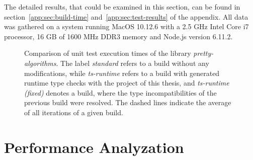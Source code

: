 The detailed results, that could be examined in this section, can be found in section~\ref{app:sec:build-time} and~\ref{app:sec:test-results} of the appendix. All data was gathered on a system running MacOS 10.12.6 with a 2.5 GHz Intel Core i7 processor, 16 GB of 1600 MHz DDR3 memory and Node.js version 6.11.2.
\begin{figure}
\centering

\caption{Comparison of unit test execution times of the library \emph{pretty-algorithms}. The label \emph{standard} refers to a build without any modifications, while \emph{ts-runtime} refers to a build with generated runtime type checks with the project of this thesis, and \emph{ts-runtime (fixed)} denotes a build, where the type incompatibilities of the previous build were resolved. The dashed lines indicate the average of all iterations of a given build.}
\label{fig:operational-test}
\end{figure}

\section{Performance Analyzation}
\label{sec:performance-analyzation}

